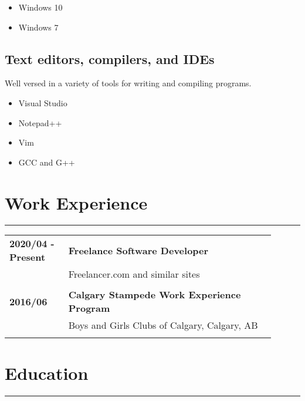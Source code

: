 \documentclass[letterpaper]{article}
\newcommand{\horizontalLine}{%
    \rule{\linewidth}{0.4pt}
    \vspace{1ex}
}
\begin{document}
        \begin{itemize}[itemsep = 0pt]
            \item Windows 10
            \item Windows 7
        \end{itemize}

        \subsection*{Text editors, compilers, and IDEs}
        Well versed in a variety of tools for writing and compiling programs.

        \begin{itemize}[itemsep = 0pt]
            \item Visual Studio
            \item Notepad++
            \item Vim
            \item GCC and G++
        \end{itemize}

    \section*{Work Experience}

        \horizontalLine

        \begin{tabular}{p{0.2\linewidth} p{0.7\linewidth}} 
            \textbf{2020/04 - Present} & \large\textbf{Freelance Software Developer} \\
            & Freelancer.com and similar sites \\
            \\
            \textbf{2016/06} & \large\textbf{Calgary Stampede Work Experience Program} \\
            & Boys and Girls Clubs of Calgary, Calgary, AB \\
            \\
        \end{tabular}

    \section*{Education}

        \horizontalLine
\end{document}
